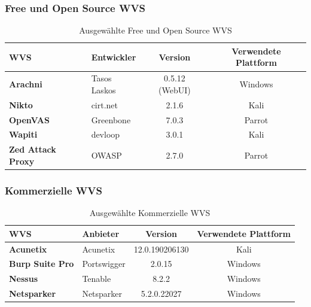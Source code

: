 \documentclass[12pt,oneside,a4paper,parskip]{scrbook}
\begin{document}
    \subsubsection{Free und Open Source WVS}
      \begin{table}[H]
        \centering
          \begin{tabular}{|l|l|c|c|}
            \hline
            \textbf{WVS}              & \textbf{Entwickler}  & \textbf{Version}     & \textbf{Verwendete Plattform}  \\
            \hline
            \textbf{Arachni}          & Tasos Laskos         & 0.5.12 (WebUI)       & Windows                       \\
            \hline
            \textbf{Nikto}            & cirt.net             & 2.1.6                & Kali                          \\
            \hline
            \textbf{OpenVAS}          & Greenbone            & 7.0.3                & Parrot                        \\
            \hline
            \textbf{Wapiti}           & devloop              & 3.0.1                & Kali                          \\
            \hline
            \textbf{Zed Attack Proxy} & OWASP                & 2.7.0                & Parrot                        \\
            \hline
          \end{tabular}
        \caption[Ausgewählte Free und Open Source WVS]{Ausgewählte Free und Open Source WVS}
      \end{table}

    \subsubsection{Kommerzielle WVS}
      \begin{table}[H]
        \centering
          \begin{tabular}{|p{4cm}|l|c|c|}
            \hline
            \textbf{WVS}            & \textbf{Anbieter} & \textbf{Version} & \textbf{Verwendete Plattform}  \\
            \hline
            \textbf{Acunetix}       & Acunetix          & 12.0.190206130   & Kali                          \\
            \hline
            \textbf{Burp Suite Pro} & Portswigger       & 2.0.15           & Windows                       \\
            \hline
            \textbf{Nessus}         & Tenable           & 8.2.2            & Windows                       \\
            \hline
            \textbf{Netsparker}     & Netsparker        & 5.2.0.22027      & Windows                       \\
            \hline
          \end{tabular}
        \caption[Ausgewählte Kommerzielle WVS]{Ausgewählte Kommerzielle WVS}
      \end{table}
\end{document}
